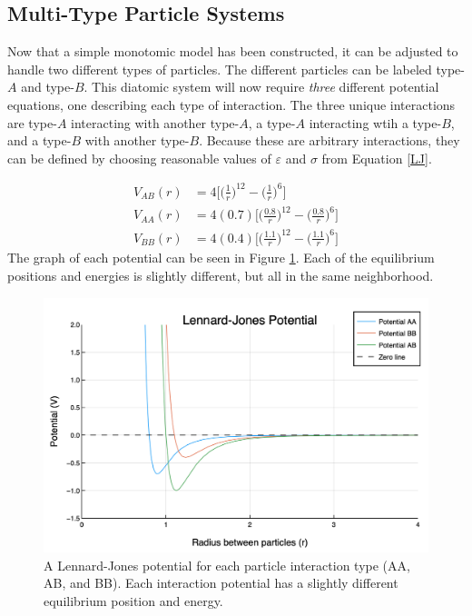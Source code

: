 \subsection{Multi-Type Particle Systems}\label{Sect:diatomic}
\par Now that a simple monotomic model has been constructed, it can be adjusted to handle two different types of particles. The different particles can be labeled type-$A$ and type-$B$. This diatomic system will now require \textit{three} different potential equations, one describing each type of interaction. The three unique interactions are type-$A$ interacting with another type-$A$, a type-$A$ interacting wtih a type-$B$, and a type-$B$ with another type-$B$. Because these are arbitrary interactions, they can be defined by choosing reasonable values of $\varepsilon$ and $\sigma$ from Equation \ref{LJ}. 

\begin{align}
V_{AB}(r) &= 4 \bigg[\Big(\frac{1}{r}\Big)^{12} - \Big(\frac{1}{r}\Big)^6\bigg] \label{LJ} \\
V_{AA}(r) &= 4 (0.7) \bigg[\Big(\frac{0.8}{r}\Big)^{12} - \Big(\frac{0.8}{r}\Big)^6\bigg] \label{LJ} \\
V_{BB}(r) &= 4 (0.4) \bigg[\Big(\frac{1.1}{r}\Big)^{12} - \Big(\frac{1.1}{r}\Big)^6\bigg] \label{LJ}
\end{align}
The graph of each potential can be seen in Figure \ref{fig3LJ}. Each of the equilibrium positions and energies is slightly different, but all in the same neighborhood.

\begin{figure}[h]
\includegraphics[scale = 0.4]{Figures/newLJPotential}
\caption{A Lennard-Jones potential for each particle interaction type (AA, AB, and BB). Each interaction potential has a slightly different equilibrium position and energy. 
\label{fig3LJ}} 
\end{figure}

